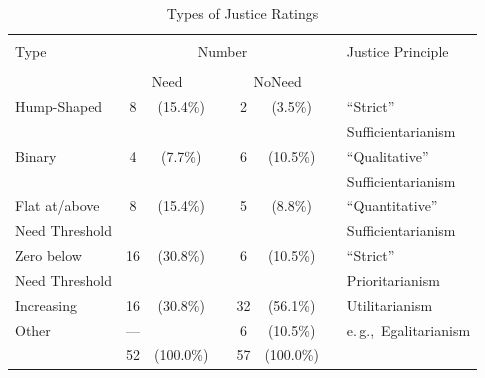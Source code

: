 \documentclass[12pt]{scrartcl}
\begin{document}
\begin{table}[ht!]
   \centering
   \caption{Types of Justice Ratings}\label{tab:individual}
   {\normalsize\small
   \begin{tabular}{lccccccl}\hline\\[-2.5ex]
   Type             & \multicolumn{5}{c}{Number}                                      &   & Justice Principle        \\\cline{2-6}\\[-2.5ex]
                    & \multicolumn{2}{c}{Need}     &   & \multicolumn{2}{c}{NoNeed}   &   &                          \\\hline\hline
   Hump-Shaped      &  8   &  (15.4\%)             &   &  2   &   (3.5\%)             &   & ``Strict''               \\
                    &      &                       &   &      &                       &   & Sufficientarianism       \\[1ex]
   Binary           &  4   &   (7.7\%)             &   &  6   &  (10.5\%)             &   & ``Qualitative''          \\
                    &      &                       &   &      &                       &   & Sufficientarianism       \\[1ex]
   Flat at/above    &  8   &  (15.4\%)             &   &  5   &   (8.8\%)             &   & ``Quantitative''         \\
   Need Threshold   &      &                       &   &      &                       &   & Sufficientarianism       \\[1ex]
   Zero below       & 16   &  (30.8\%)             &   &  6   &  (10.5\%)             &   & ``Strict''               \\
   Need Threshold   &      &                       &   &      &                       &   & Prioritarianism          \\[1ex]
   Increasing       & 16   &  (30.8\%)             &   & 32   &  (56.1\%)             &   & Utilitarianism           \\[1ex]
   Other            & ---  &                       &   &  6   &  (10.5\%)             &   & e.\,g.,~Egalitarianism   \\[0.5ex]\hline
                    & 52   & (100.0\%)             &   & 57   & (100.0\%)             &   &                          \\\hline
   \end{tabular}
   }
\end{table}
\end{document}
